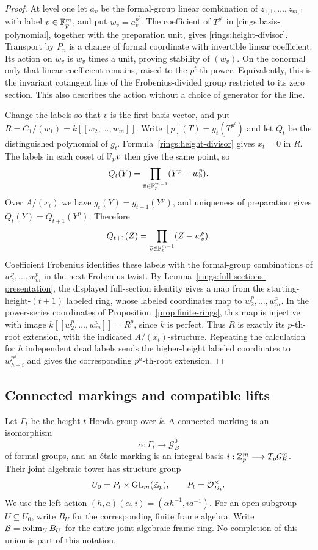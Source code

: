 \begin{proof}
At level one let $a_v$ be the formal-group linear combination of
$z_{1,1},\ldots,z_{m,1}$ with label $v\in\mathbb F_p^m$, and put
$w_v=a_v^{p^t}$.  The coefficient of $T^{p^t}$
in \eqref{rings:basis-polynomial}, together with the
preparation unit, gives \eqref{rings:height-divisor}.
Transport by $P_n$ is a change of formal coordinate with
invertible linear coefficient.  Its action on $w_v$ is $w_v$
times a unit, proving stability of $(w_v)$.  On the conormal
only that linear coefficient remains, raised to the $p^t$-th
power.  Equivalently, this is the invariant cotangent line of
the Frobenius-divided group restricted to its zero section.
This also describes the action without a choice of generator
for the line.

Change the labels so that $v$ is the first basis vector, and
put $R=C_1/(w_1)=k[[w_2,\ldots,w_m]]$.
Write $[p](T)=g_t(T^{p^t})$ and let $Q_t$ be the distinguished
polynomial of $g_t$.  Formula~\eqref{rings:height-divisor}
gives $x_t=0$ in $R$.  The labels in each coset of $\mathbb F_p v$
then give the same point, so
\[
 Q_t(Y)=\prod_{\bar v\in\mathbb F_p^{m-1}}
              (Y^p-w_{\bar v}^{p}).
\]
Over $A/(x_t)$ we have $g_t(Y)=g_{t+1}(Y^p)$, and uniqueness
of preparation gives $Q_t(Y)=Q_{t+1}(Y^p)$.  Therefore
\[
 Q_{t+1}(Z)=\prod_{\bar v\in\mathbb F_p^{m-1}}(Z-w_{\bar v}^p).
\]
Coefficient Frobenius identifies these labels with the
formal-group combinations of $w_2^p,\ldots,w_m^p$ in the
next Frobenius twist.  By Lemma~\ref{rings:full-sections-presentation},
the displayed full-section identity gives a map from the
starting-height-$(t+1)$ labeled ring, whose labeled
coordinates map to $w_2^p,\ldots,w_m^p$.
In the power-series coordinates of
Proposition~\ref{prop:finite-rings}, this map is injective with image
$k[[w_2^p,\ldots,w_m^p]]=R^p$, since $k$ is perfect.
Thus $R$ is exactly its $p$-th-root extension, with the
indicated $A/(x_t)$-structure.  Repeating the calculation
for $h$ independent dead labels sends the higher-height
labeled coordinates to $w_{h+i}^{p^h}$ and gives the corresponding
$p^h$-th-root extension.
\end{proof}

\subsection{Connected markings and compatible lifts}

Let $\Gamma_t$ be the height-$t$ Honda group over $k$.
A connected marking is an isomorphism
\[
 \alpha:\Gamma_t\longrightarrow \mathcal G_B^0
\]
of formal groups, and an \'etale marking is an integral basis
$i:\mathbb Z_p^m\longrightarrow T_p\mathcal G_B^{\mathrm{et}}$.
Their joint algebraic tower has structure group
\[
 U_0=P_t\times\operatorname{GL}_m(\mathbb Z_p),\qquad
 P_t=\mathcal O_{D_t}^{\times}.
\]
We use the left action
$(h,a)(\alpha,i)=(\alpha h^{-1},ia^{-1})$.
For an open subgroup $U\subseteq U_0$, write $B_U$ for the
corresponding finite frame algebra.  Write
$\mathcal B=\operatorname*{colim}_U B_U$ for the entire joint algebraic
frame ring.  No completion of this union is part of this
notation.

